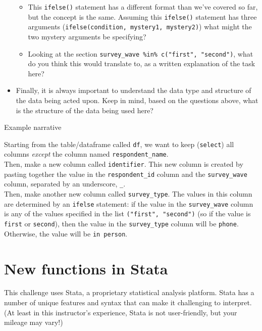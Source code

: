 \documentclass[
]{book}
\providecommand{\tightlist}{%
  \setlength{\itemsep}{0pt}\setlength{\parskip}{0pt}}
\begin{document}
\begin{itemize}
  \begin{itemize}
  \tightlist
  \item
    This \texttt{ifelse()} statement has a different format than we've covered so far, but the concept is the same. Assuming this \texttt{ifelse()} statement has three arguments (\texttt{ifelse(condition,\ mystery1,\ mystery2)}) what might the two mystery arguments be specifying?
  \item
    Looking at the section \texttt{survey\_wave\ \%in\%\ c("first",\ "second")}, what do you think this would translate to, as a written explanation of the task here?
  \end{itemize}
\item
  Finally, it is always important to understand the data type and structure of the data being acted upon. Keep in mind, based on the questions above, what is the structure of the data being used here?
\end{itemize}

Example narrative

Starting from the table/dataframe called \texttt{df}, we want to keep (\texttt{select}) all columns \emph{except} the column named \texttt{respondent\_name}.\\

Then, make a new column called \texttt{identifier}. This new column is created by pasting together the value in the \texttt{respondent\_id} column and the \texttt{survey\_wave} column, separated by an underscore, \texttt{\_}.\\

Then, make another new column called \texttt{survey\_type}. The values in this column are determined by an \texttt{ifelse} statement: if the value in the \texttt{survey\_wave} column is any of the values specified in the list \texttt{("first",\ "second")} (so if the value is \texttt{first} or \texttt{second}), then the value in the \texttt{survey\_type} column will be \texttt{phone}. Otherwise, the value will be \texttt{in\ person}.\\

\hfill\break

\section{New functions in Stata}\label{new-functions-in-stata}

This challenge uses Stata, a proprietary statistical analysis platform. Stata has a number of unique features and syntax that can make it challenging to interpret. (At least in this instructor's experience, Stata is not user-friendly, but your mileage may vary!)
\end{document}
